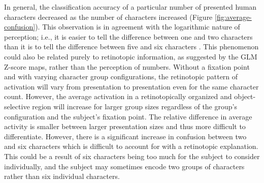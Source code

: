 \documentclass[5p,authoryear]{elsarticle}
\begin{document}

In general, the classification accuracy of a particular number of presented human characters decreased as the number of characters increased (Figure \ref{fig:average-confusion}).
This observation is in agreement with the logarithmic nature of perception; i.e., it is easier to tell the difference between one and two characters than it is to tell the difference between five and six characters \citep{Shepard1975,Dehaene2003}.
This phenomenon could also be related purely to retinotopic information, as suggested by the GLM Z-score maps, rather than the perception of numbers.
Without a fixation point and with varying character group configurations, the retinotopic pattern of activation will vary from presentation to presentation even for the same character count.
However, the average activation in a retinotopically organized and object-selective region will increase for larger group sizes regardless of the group's configuration and the subject's fixation point.
The relative difference in average activity is smaller between larger presentation sizes and thus more difficult to differentiate.
However, there is a significant increase in confusion between two and six characters which is difficult to account for with a retinotopic explanation.
This could be a result of six characters being too much for the subject to consider individually, and the subject may sometimes encode two groups of characters rather than six individual characters.
\end{document}

